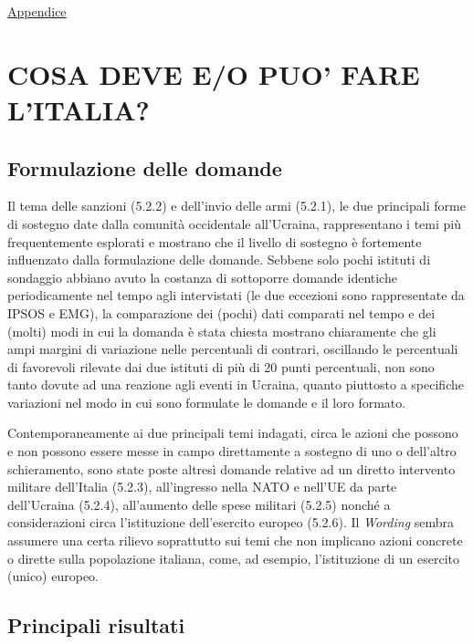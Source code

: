 \documentclass[
  openany]{book}
\begin{document}
\href{https://github.com/LucianaFazio/Ucrania/blob/main/PDF_Appendice/IV.\%20La\%20guerra\%20e\%20il\%20suo\%20andamento\%20v.4.pdf}{Appendice}

\hypertarget{cosa-deve-eo-puo-fare-litalia}{%
\chapter{COSA DEVE E/O PUO' FARE L'ITALIA?}\label{cosa-deve-eo-puo-fare-litalia}}

\hypertarget{formulazione-delle-domande-3}{%
\section{Formulazione delle domande}\label{formulazione-delle-domande-3}}

Il tema delle sanzioni (5.2.2) e dell'invio delle armi (5.2.1), le due principali forme di sostegno date dalla comunità occidentale all'Ucraina, rappresentano i temi più frequentemente esplorati e mostrano che il livello di sostegno è fortemente influenzato dalla formulazione delle domande. Sebbene solo pochi istituti di sondaggio abbiano avuto la costanza di sottoporre domande identiche periodicamente nel tempo agli intervistati (le due eccezioni sono rappresentate da IPSOS e EMG), la comparazione dei (pochi) dati comparati nel tempo e dei (molti) modi in cui la domanda è stata chiesta mostrano chiaramente che gli ampi margini di variazione nelle percentuali di contrari, oscillando le percentuali di favorevoli rilevate dai due istituti di più di 20 punti percentuali, non sono tanto dovute ad una reazione agli eventi in Ucraina, quanto piuttosto a specifiche variazioni nel modo in cui sono formulate le domande e il loro formato.

Contemporaneamente ai due principali temi indagati, circa le azioni che possono e non possono essere messe in campo direttamente a sostegno di uno o dell'altro schieramento, sono state poste altresì domande relative ad un diretto intervento militare dell'Italia (5.2.3), all'ingresso nella NATO e nell'UE da parte dell'Ucraina (5.2.4), all'aumento delle spese militari (5.2.5) nonché a considerazioni circa l'istituzione dell'esercito europeo (5.2.6). Il \emph{Wording} sembra assumere una certa rilievo soprattutto sui temi che non implicano azioni concrete o dirette sulla popolazione italiana, come, ad esempio, l'istituzione di un esercito (unico) europeo.

\hypertarget{principali-risultati-3}{%
\section{Principali risultati}\label{principali-risultati-3}}
\end{document}
